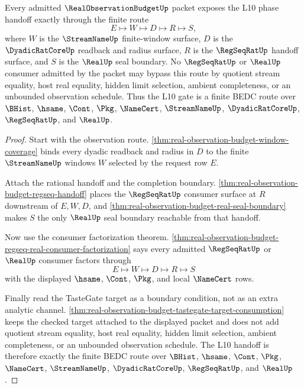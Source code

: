 \begin{theorem}
\label{thm:real-observation-budget-l10-gate-handoff-exactness}
Every admitted $\RealObservationBudgetUp$ packet exposes the L10 phase handoff exactly through the finite route
$$
E \longmapsto W \longmapsto D \longmapsto R \longmapsto S,
$$
where $W$ is the $\StreamNameUp$ finite-window surface, $D$ is the $\DyadicRatCoreUp$ readback and radius surface, $R$ is the $\RegSeqRatUp$ handoff surface, and $S$ is the $\RealUp$ seal boundary. No $\RegSeqRatUp$ or $\RealUp$ consumer admitted by the packet may bypass this route by quotient stream equality, host real equality, hidden limit selection, ambient completeness, or an unbounded observation schedule. Thus the L10 gate is a finite BEDC route over $\BHist$, $\hsame$, $\Cont$, $\Pkg$, $\NameCert$, $\StreamNameUp$, $\DyadicRatCoreUp$, $\RegSeqRatUp$, and $\RealUp$.
\end{theorem}
\begin{proof}
Start with the observation route. \autoref{thm:real-observation-budget-window-coverage} binds every dyadic readback and radius in $D$ to the finite $\StreamNameUp$ windows $W$ selected by the request row $E$.

Attach the rational handoff and the completion boundary. \autoref{thm:real-observation-budget-regseq-handoff} places the $\RegSeqRatUp$ consumer surface at $R$ downstream of $E,W,D$, and \autoref{thm:real-observation-budget-real-seal-boundary} makes $S$ the only $\RealUp$ seal boundary reachable from that handoff.

Now use the consumer factorization theorem. \autoref{thm:real-observation-budget-regseq-real-consumer-factorization} says every admitted $\RegSeqRatUp$ or $\RealUp$ consumer factors through
$$
E \longmapsto W \longmapsto D \longmapsto R \longmapsto S
$$
with the displayed $\hsame$, $\Cont$, $\Pkg$, and local $\NameCert$ rows.

Finally read the TasteGate target as a boundary condition, not as an extra analytic channel. \autoref{thm:real-observation-budget-tastegate-target-consumption} keeps the checked target attached to the displayed packet and does not add quotient stream equality, host real equality, hidden limit selection, ambient completeness, or an unbounded observation schedule. The L10 handoff is therefore exactly the finite BEDC route over $\BHist$, $\hsame$, $\Cont$, $\Pkg$, $\NameCert$, $\StreamNameUp$, $\DyadicRatCoreUp$, $\RegSeqRatUp$, and $\RealUp$.
\end{proof}

